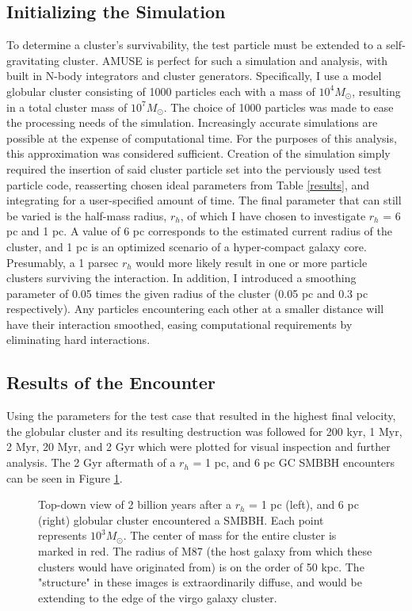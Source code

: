 \documentclass{aastex62}
\begin{document}
\subsection{Initializing the Simulation}
To determine a cluster's survivability, the test particle must be extended to a self-gravitating cluster. AMUSE is perfect for such a simulation and analysis, with built in N-body integrators and cluster generators. Specifically, I use a \citet{plum11} model globular cluster consisting of 1000 particles each with a mass of $10^4 M_{\odot}$, resulting in a total cluster mass of $10^7 M_{\odot}$. The choice of 1000 particles was made to ease the processing needs of the simulation. Increasingly accurate simulations are possible at the expense of computational time. For the purposes of this analysis, this approximation was considered sufficient. Creation of the simulation simply required the insertion of said cluster particle set into the perviously used test particle code, reasserting chosen ideal parameters from Table \ref{results}, and integrating for a user-specified amount of time. The final parameter that can still be varied is the half-mass radius, $r_{h}$, of which I have chosen to investigate  $r_{h}$ = 6 pc and 1 pc. A value of 6 pc corresponds to the estimated current radius of the cluster, and 1 pc is an optimized scenario of a hyper-compact galaxy core. Presumably, a 1 parsec  $r_{h}$ would more likely result in one or more particle clusters surviving the interaction. In addition, I introduced a smoothing parameter of 0.05 times the given radius of the cluster (0.05 pc and 0.3 pc respectively). Any particles encountering each other at a smaller distance will have their interaction smoothed, easing computational requirements by eliminating hard interactions. 
\subsection{Results of the Encounter}
Using the parameters for the test case that resulted in the highest final velocity, the globular cluster and its resulting destruction was followed for 200 kyr, 1 Myr, 2 Myr, 20 Myr, and 2 Gyr which were plotted for visual inspection and further analysis. The 2 Gyr aftermath of a $r_{h}$ = 1 pc, and 6 pc GC SMBBH encounters can be seen in Figure \ref{fig5}. 

\begin{figure}
\centering
\caption{Top-down view of 2 billion years after a $r_{h}$ = 1 pc (left), and 6 pc (right) globular cluster encountered a SMBBH. Each point represents $10^3 M_{\odot}$. The center of mass for the entire cluster is marked in red. The radius of M87 (the host galaxy from which these clusters would have originated from) is on the order of 50 kpc. The "structure" in these images is extraordinarily diffuse, and would be extending to the edge of the virgo galaxy cluster.\label{fig5}}
\end{figure}
\end{document}
